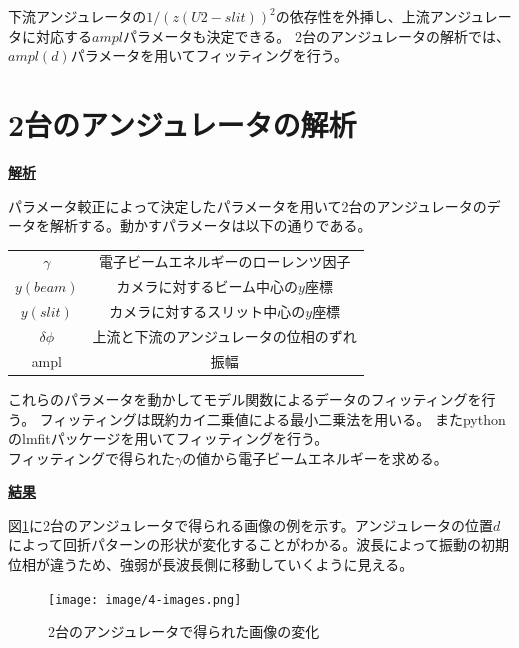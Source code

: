 \documentclass[a4paper,11pt,uplatex]{jsbook}
\begin{document}
下流アンジュレータの$1/(z(U2-slit))^2$の依存性を外挿し、上流アンジュレータに対応する$ampl$パラメータも決定できる。
2台のアンジュレータの解析では、$ampl(d)$パラメータを用いてフィッティングを行う。

\section{2台のアンジュレータの解析}
\noindent \textbf{\underline{解析}}\par
パラメータ較正によって決定したパラメータを用いて2台のアンジュレータのデータを解析する。動かすパラメータは以下の通りである。
\begin{table}[h]
\centering
\begin{tabular}{cc}
  $\gamma$ & 電子ビームエネルギーのローレンツ因子 \\
  $y(beam)$ & カメラに対するビーム中心の$y$座標 \\
  $y(slit)$ & カメラに対するスリット中心の$y$座標 \\
  $\delta \phi$ & 上流と下流のアンジュレータの位相のずれ\\
  ampl & 振幅
\end{tabular}
\end{table}

これらのパラメータを動かしてモデル関数によるデータのフィッティングを行う。
フィッティングは既約カイ二乗値による最小二乗法を用いる。
またpythonのlmfitパッケージ\cite{lmfit}を用いてフィッティングを行う。\\
フィッティングで得られた$\gamma$の値から電子ビームエネルギーを求める。

\noindent \textbf{\underline{結果}}\par
図\ref{images}に2台のアンジュレータで得られる画像の例を示す。アンジュレータの位置$d$によって回折パターンの形状が変化することがわかる。波長によって振動の初期位相が違うため、強弱が長波長側に移動していくように見える。
\begin{figure}[h]
  \centering
  \texttt{[image: image/4-images.png]}
  \caption[干渉による画像の変化]{2台のアンジュレータで得られた画像の変化}\label{images}
\end{figure}
\end{document}
